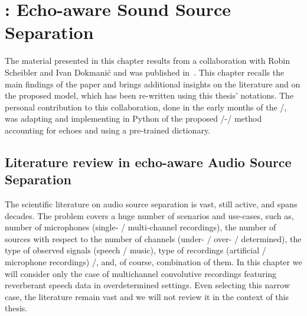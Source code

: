 \chapter{: Echo-aware Sound Source Separation}\label{ch:separake}

\vspace{-2.5em}
  \synopsisChSeparake

\mynewline
The material presented in this chapter results from a collaboration with Robin Scheibler and Ivan Dokmani\'{c} and was published in~\cite{scheibler2018separake}.
This chapter recalls the main findings of the paper and brings additional insights on the literature and on the proposed model, which has been re-written using this thesis' notations.
The personal contribution to this collaboration, done in the early months of the \PhD/, was adapting and implementing in Python of the proposed \EMdef/-\NMF/ method accounting for echoes and using a pre-trained dictionary.

\section{Literature review in echo-aware Audio Source Separation}\label{sec:separake:sota}

The scientific literature on audio source separation is vast, still active, and spans decades.
The problem covers a huge number of scenarios and use-cases, such as, number of microphones (single- \vs/ multi-channel recordings), the number of sources with respect to the number of channels (under- \vs/ over- \vs/ determined), the type of observed signals (speech \vs/ music), type of recordings (artificial \vs/ microphone recordings) \etc/, and, of course, combination of them.
In this chapter we will consider only the case of multichannel convolutive recordings featuring reverberant speech data in overdetermined settings.
Even selecting this narrow case, the literature remain vast and we will not review it in the context of this thesis.

